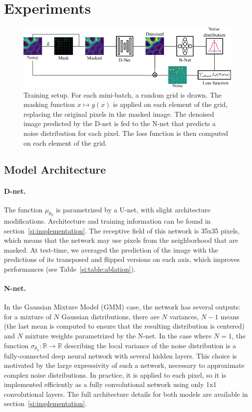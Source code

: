 \documentclass{article}
\begin{document}
\section{Experiments}
\begin{figure}[!htbp]
\vskip -0.1in
\begin{center}
\centerline{\includegraphics[width=\columnwidth]{fig_plomberie_1col.pdf}}
\caption{Training setup.
For each mini-batch, a random grid is drawn.
The masking function $x\mapsto g(x)$ is applied on each element of the grid, replacing the original pixels in the masked image.
The denoised image predicted by the D-net is fed to the N-net that predicts a noise distribution for each pixel.
The loss function is then computed on each element of the grid.
}
\label{fig:plumbing}
\end{center}
\end{figure}

\label{sec:experiments}
\subsection{Model Architecture}
\paragraph{D-net.}
The function $\mu_{\theta_d}$ is parametrized by a U-net, with slight architecture modifications.
Architecture and training information can be found in section~\ref{si:implementation}.
The receptive field of this network is 35x35 pixels, which means that the network may use pixels from the neighborhood that are masked.
At test-time, we averaged the prediction of the image with the predictions of its transposed and flipped versions on each axis, which improves performances (see Table~\ref{si:table:ablation}).

\paragraph{N-net.}
In the Gaussian Mixture Model (GMM) case, the network has several outputs: for a mixture of $N$ Gaussian distributions, there are $N$ variances, $N-1$ means (the last mean is computed to ensure that the resulting distribution is centered) and $N$ mixture weights parametrized by the N-net.
In the case where $N=1$, the function $\sigma_{\theta_n}: \mathbb{R} \to \mathbb{R}$ describing the local variance of the noise distribution is a fully-connected deep neural network with several hidden layers. This choice is motivated by the large expressivity of such a network, necessary to approximate complex noise distributions. In practice, it is applied to each pixel, so it is implemented efficiently as a fully convolutional network using only 1x1 convolutional layers. The full architecture details for both models are available in section~\ref{si:implementation}.
\end{document}
